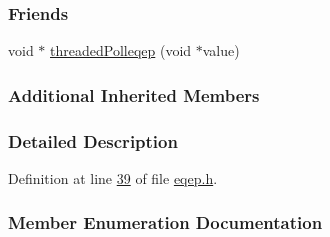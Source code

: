 \subsubsection*{Friends}
\begin{DoxyCompactItemize}
\item 
void $\ast$ \hyperlink{class_hardware_1_1e_q_e_p_a0dd4c4778480f930ef697f898f2d4668}{threaded\+Polleqep} (void $\ast$value)
\end{DoxyCompactItemize}
\subsubsection*{Additional Inherited Members}


\subsubsection{Detailed Description}


Definition at line \hyperlink{eqep_8h_source_l00039}{39} of file \hyperlink{eqep_8h_source}{eqep.\+h}.



\subsubsection{Member Enumeration Documentation}
\hypertarget{class_hardware_1_1e_q_e_p_a3f97f26c64d49d6f2643a257b7249070}{}
